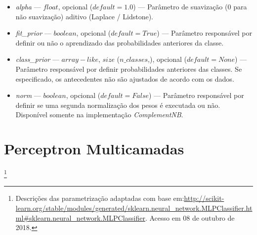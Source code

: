 \documentclass[
	12pt,				%
	oneside,			%
	a4paper,			%
	english,			%
	brazil				%
	]{abntex2ppgsi}
\begin{document}
{{{\begin{apendicesenv}
\begin{itemize}
\item \textit{alpha} --- $float$, opcional ($default=1.0$) --- Parâmetro de suavização (0 para não suavização) aditivo (Laplace / Lidstone).
\item \textit{fit\_prior} --- $boolean$, opcional ($default=True$) --- Parâmetro responsável por definir ou não o aprendizado das probabilidades anteriores da classe.
\item \textit{class\_prior} --- $array-like$, $size$ ($n\_classes$,), opcional ($default=None$) --- Parâmetro responsável por definir probabilidades anteriores das classes. Se especificado, os antecedentes não são ajustados de acordo com os dados.
\item \textit{norm} --- $boolean$, opcional ($default=False$) ---
Parâmetro responsável por definir se uma segunda normalização dos pesos é executada ou não. Disponível somente na implementação \textit{ComplementNB}.
\end{itemize}

\section{Perceptron Multicamadas}\footnote{Descrições das parametrização adaptadas com base em:\url{http://scikit-learn.org/stable/modules/generated/sklearn.neural_network.MLPClassifier.html\#sklearn.neural_network.MLPClassifier}. Acesso em 08 de outubro de 2018.}


\end{apendicesenv}}}}
\end{document}
